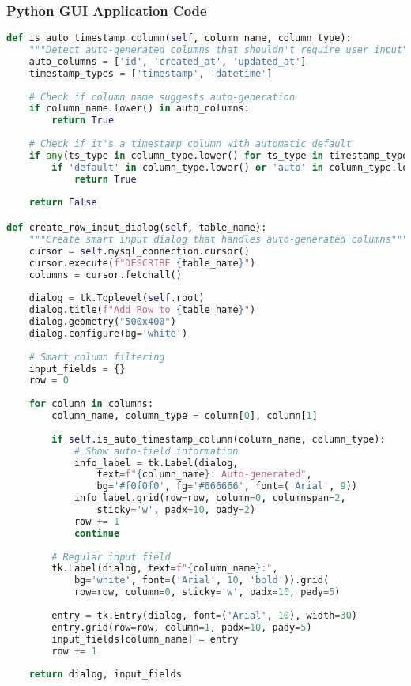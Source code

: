 \subsubsection{Python GUI Application Code}
\begin{lstlisting}[language=Python, caption=GUI Migration Manager - Key Functions]
def is_auto_timestamp_column(self, column_name, column_type):
    """Detect auto-generated columns that shouldn't require user input"""
    auto_columns = ['id', 'created_at', 'updated_at']
    timestamp_types = ['timestamp', 'datetime']
    
    # Check if column name suggests auto-generation
    if column_name.lower() in auto_columns:
        return True
    
    # Check if it's a timestamp column with automatic default
    if any(ts_type in column_type.lower() for ts_type in timestamp_types):
        if 'default' in column_type.lower() or 'auto' in column_type.lower():
            return True
    
    return False

def create_row_input_dialog(self, table_name):
    """Create smart input dialog that handles auto-generated columns"""
    cursor = self.mysql_connection.cursor()
    cursor.execute(f"DESCRIBE {table_name}")
    columns = cursor.fetchall()
    
    dialog = tk.Toplevel(self.root)
    dialog.title(f"Add Row to {table_name}")
    dialog.geometry("500x400")
    dialog.configure(bg='white')
    
    # Smart column filtering
    input_fields = {}
    row = 0
    
    for column in columns:
        column_name, column_type = column[0], column[1]
        
        if self.is_auto_timestamp_column(column_name, column_type):
            # Show auto-field information
            info_label = tk.Label(dialog, 
                text=f"{column_name}: Auto-generated", 
                bg='#f0f0f0', fg='#666666', font=('Arial', 9))
            info_label.grid(row=row, column=0, columnspan=2, 
                sticky='w', padx=10, pady=2)
            row += 1
            continue
        
        # Regular input field
        tk.Label(dialog, text=f"{column_name}:", 
            bg='white', font=('Arial', 10, 'bold')).grid(
            row=row, column=0, sticky='w', padx=10, pady=5)
        
        entry = tk.Entry(dialog, font=('Arial', 10), width=30)
        entry.grid(row=row, column=1, padx=10, pady=5)
        input_fields[column_name] = entry
        row += 1
    
    return dialog, input_fields
\end{lstlisting}

